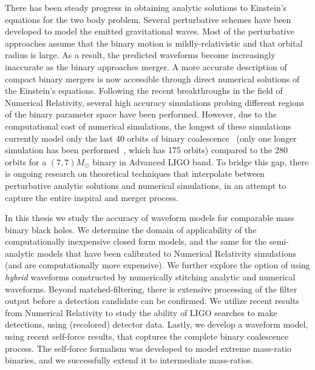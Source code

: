 There has been steady progress in obtaining analytic solutions to Einstein's
equations for the two body problem. Several perturbative schemes have been 
developed to model the emitted gravitational waves. Most of
the perturbative approaches assume that the binary motion is 
mildly-relativistic and that orbital radius is large. As a result, the predicted 
waveforms become increasingly inaccurate as the binary approaches merger. 
A more accurate description of compact binary mergers is now accessible
through direct numerical solutions of the Einstein's equations.
Following the recent breakthroughs in the field of Numerical Relativity, 
several high accuracy simulations probing different regions of the binary 
parameter space have been performed. 
However, due to the computational cost of numerical simulations, the 
longest of these simulations currently model only the last 40 orbits
of binary coalescence~\cite{Mroue:2013xna}
(only one longer simulation has been performed~\cite{BelaLongSimulation},
which has 175 orbits) compared to the 280 orbits for a $(7,7) M_\odot$
binary in Advanced LIGO band. To bridge this gap, there is ongoing
research on theoretical techniques that interpolate between  
perturbative analytic solutions and numerical simulations, in an attempt to 
capture the entire inspiral and merger process.

In this thesis we study the accuracy of waveform models for comparable mass
binary black holes.
We determine the domain of applicability of the computationally inexpensive closed 
form models, and the same for the semi-analytic models that have been calibrated
to Numerical Relativity simulations (and are computationally more expensive).
We further explore the option of 
using {\it hybrid} waveforms constructed by numerically stitching 
analytic and numerical waveforms. Beyond matched-filtering, there 
is extensive processing of the filter output before a detection candidate can
be confirmed. We utilize recent results from Numerical Relativity to study
the ability of LIGO searches to make detections, using (recolored) detector data.
Lastly, we develop a waveform model, using recent self-force results, that 
coptures the complete binary coalescence process. The self-force formalism was
developed to model extreme mass-ratio binaries, and we successfully extend it 
to intermediate mass-ratios.
